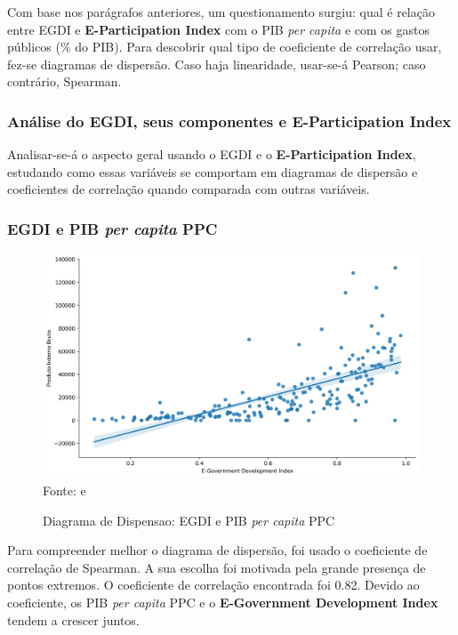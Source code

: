 Com base nos parágrafos anteriores, um questionamento surgiu: qual é relação entre EGDI e \textbf{E-Participation Index} com o PIB \textit{per capita} e com os gastos públicos (\% do PIB). Para descobrir qual tipo de coeficiente de correlação usar, fez-se diagramas de dispersão. Caso haja linearidade, usar-se-á Pearson; caso contrário, Spearman.

\subsubsection{Análise do EGDI, seus componentes e E-Participation Index}

Analisar-se-á o aspecto geral usando o EGDI e o \textbf{E-Participation Index}, estudando como essas variáveis se comportam em diagramas de dispersão e coeficientes de correlação quando comparada com outras variáveis.

\subsubsection{EGDI e PIB \textit{per capita} PPC}

\begin{figure}[H]
	\centering
	\caption{Diagrama de Dispensao: EGDI e PIB \textit{per capita} PPC}
	\includegraphics[width=1\linewidth]{figuras/egdi/dispensao_egov_pib}
	\label{fig:dispensao_egov_pib}
	\footnotesize{Fonte: \cite{ONU_EGDI} e \cite{WB_pib_per_capita_países}}
\end{figure}

Para compreender melhor o diagrama de dispersão, foi usado o coeficiente de correlação de Spearman. A sua escolha foi motivada pela grande presença de pontos extremos. O coeficiente de correlação encontrada foi 0.82. Devido ao coeficiente, os PIB \textit{per capita} PPC e o \textbf{E-Government Development Index} tendem a crescer juntos.


